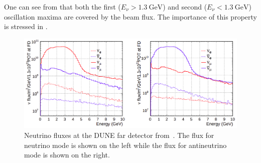 One can see from  that both the first ($E_{\nu} > \SI{1.3}{\giga\electronvolt}$) and second ($E_{\nu} < \SI{1.3}{\giga\electronvolt}$) oscillation maxima are covered by the beam flux.
The importance of this property is stressed in .

\begin{figure}[h]
  \centering
  \includegraphics[width=.95\linewidth]{files/figures/dune_detector/duneFDFlux}
  \caption[Neutrino fluxes at the DUNE far detector.]{Neutrino fluxes at the DUNE far detector from~\cite{tdrVol2}. The flux for neutrino mode is shown on the left while the flux for antineutrino mode is shown on the right.}
  \label{fig:fdFlux}
\end{figure}

